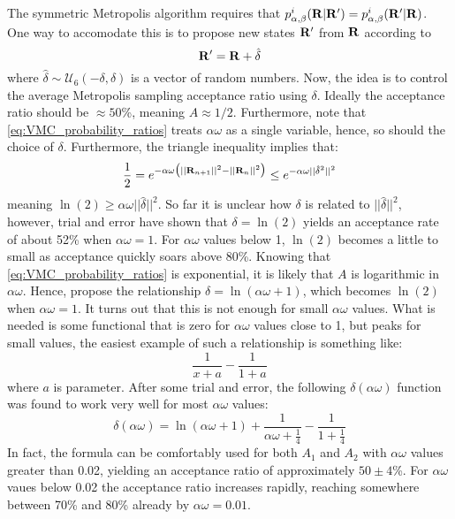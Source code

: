 \documentclass[nofootinbib,reprint,english]{revtex4-1}
\begin{document}
The symmetric Metropolis algorithm requires that \(p_{\alpha,\beta}^i(\vb{R}|\vb{R}')=p_{\alpha,\beta}^i(\vb{R}'|\vb{R})\). One way to accomodate this is to propose new states \(\vb{R}'\) from \(\vb{R}\) according to
\begin{equation}
\vb{R}'=\vb{R}+\hat{\delta}
\end{equation}
where \(\hat{\delta}\sim\mathcal{U}_6(-\delta,\delta)\) is a vector of random numbers. Now, the idea is to control the average Metropolis sampling acceptance ratio using \(\delta\). Ideally the acceptance ratio should be \(\approx50\)\%, meaning \(A\approx1/2\). Furthermore, note that \eqref{eq:VMC_probability_ratios} treats \(\alpha\omega\) as a single variable, hence, so should the choice of \(\delta\). Furthermore, the triangle inequality implies that:
\[\frac{1}{2}=e^{-\alpha\omega\big(||\vb{R}_{n+1}||^2-||\vb{R}_n||^2\big)}\leq e^{-\alpha\omega||\hat{\delta}^2||^2}\]
meaning \(\ln(2)\geq\alpha\omega||\hat{\delta}||^2\). So far it is unclear how \(\delta\) is related to \(||\hat{\delta}||^2\), however, trial and error have shown that \(\delta=\ln(2)\) yields an acceptance rate of about 52\% when \(\alpha\omega=1\). For \(\alpha\omega\) values below 1, \(\ln(2)\) becomes a little to small as acceptance quickly soars above 80\%. Knowing that \eqref{eq:VMC_probability_ratios} is exponential, it is likely that \(A\) is logarithmic in \(\alpha\omega\). Hence, propose the relationship \(\delta=\ln(\alpha\omega+1)\), which becomes \(\ln(2)\) when \(\alpha\omega=1\). It turns out that this is not enough for small \(\alpha\omega\) values. What is needed is some functional that is zero for \(\alpha\omega\) values close to 1, but peaks for small values, the easiest example of such a relationship is something like:
\[\frac{1}{x+a}-\frac{1}{1+a}\]
where \(a\) is parameter. After some trial and error, the following \(\delta(\alpha\omega)\) function was found to work very well for most \(\alpha\omega\) values:
\begin{equation}
\delta(\alpha\omega)=\ln(\alpha\omega+1)+\frac{1}{\alpha\omega+\frac{1}{4}}-\frac{1}{1+\frac{1}{4}}
\end{equation}
In fact, the formula can be comfortably used for both \(A_1\) and \(A_2\) with \(\alpha\omega\) values greater than 0.02, yielding an acceptance ratio of approximately \(50\pm4\)\%. For \(\alpha\omega\) vaues below 0.02 the acceptance ratio increases rapidly, reaching somewhere between 70\% and 80\%  already by \(\alpha\omega=0.01\).
\end{document}
